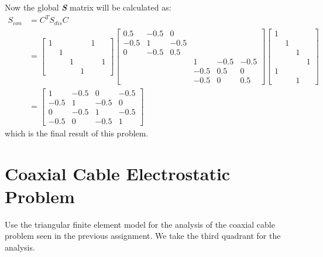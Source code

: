 \documentclass[a4paper,titlepage]{article}
\begin{document}
		Now the global \textbf{\textit{S}} matrix will be calculated as:
		\begin{align*}
			S_{con} &= C^TS_{dis}C \\
			&= 
			\begin{bmatrix}
				1&&&&1&\\
				&1&&&&\\
				&&1&&&1\\
				&&&1&&
			\end{bmatrix}
			\begin{bmatrix}
				0.5 & -0.5 & 0 & & & \\
				-0.5 & 1 & -0.5 & & & \\
				0 & -0.5 & 0.5 & & & \\
				& & & 1 & -0.5 & -0.5 \\
				& & & -0.5 & 0.5 & 0 \\
				& & & -0.5 & 0 & 0.5
			\end{bmatrix}
			\begin{bmatrix}
				1&&&\\
				&1&&\\
				&&1&\\
				&&&1\\
				1&&&\\
				&&1&
			\end{bmatrix}\\
			&= \begin{bmatrix}
				1 & -0.5 & 0 & -0.5\\
				-0.5 & 1 & -0.5 & 0\\
				0 & -0.5 & 1 & -0.5\\
				-0.5 & 0 & -0.5 & 1
			\end{bmatrix}
		\end{align*}
		which is the final result of this problem.
	\section{Coaxial Cable Electrostatic Problem}
		Use the triangular finite element model for the analysis of the coaxial cable problem seen in the previous assignment. We take the third quadrant for the analysis. 
\end{document}
